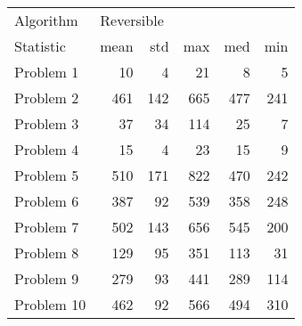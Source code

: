 \begin{tabular}{lrrrrr}
\toprule
Algorithm & \multicolumn{5}{l}{Reversible} \\
Statistic &       mean &  std &  max &  med &  min \\
\midrule
Problem 1  &         10 &    4 &   21 &    8 &    5 \\
Problem 2  &        461 &  142 &  665 &  477 &  241 \\
Problem 3  &         37 &   34 &  114 &   25 &    7 \\
Problem 4  &         15 &    4 &   23 &   15 &    9 \\
Problem 5  &        510 &  171 &  822 &  470 &  242 \\
Problem 6  &        387 &   92 &  539 &  358 &  248 \\
Problem 7  &        502 &  143 &  656 &  545 &  200 \\
Problem 8  &        129 &   95 &  351 &  113 &   31 \\
Problem 9  &        279 &   93 &  441 &  289 &  114 \\
Problem 10 &        462 &   92 &  566 &  494 &  310 \\
\bottomrule
\end{tabular}
